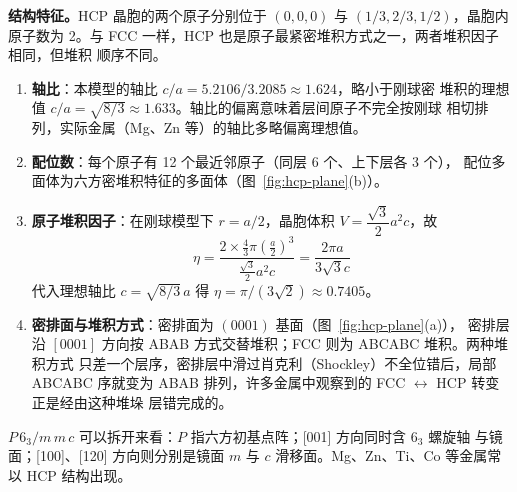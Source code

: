 \textbf{结构特征。}HCP 晶胞的两个原子分别位于 $(0,0,0)$ 与 $(1/3,2/3,1/2)$，晶胞内
原子数为 2。与 FCC 一样，HCP 也是原子最紧密堆积方式之一，两者堆积因子相同，但堆积
顺序不同。

\begin{enumerate}[label=（\arabic*）]
  \item \textbf{轴比}：本模型的轴比 $c/a=5.2106/3.2085\approx1.624$，略小于刚球密
    堆积的理想值 $c/a=\sqrt{8/3}\approx1.633$。轴比的偏离意味着层间原子不完全按刚球
    相切排列，实际金属（Mg、Zn 等）的轴比多略偏离理想值。
  \item \textbf{配位数}：每个原子有 12 个最近邻原子（同层 6 个、上下层各 3 个），
    配位多面体为六方密堆积特征的多面体（图~\ref{fig:hcp-plane}(b)）。
  \item \textbf{原子堆积因子}：在刚球模型下 $r=a/2$，晶胞体积
    $V=\dfrac{\sqrt{3}}{2}a^2c$，故
    \begin{equation}
      \eta=\frac{2\times\frac{4}{3}\pi\left(\frac{a}{2}\right)^3}
                {\frac{\sqrt{3}}{2}a^2c}
        =\frac{2\pi a}{3\sqrt{3}c}
    \end{equation}
    代入理想轴比 $c=\sqrt{8/3}\,a$ 得 $\eta=\pi/(3\sqrt{2})\approx0.7405$。
  \item \textbf{密排面与堆积方式}：密排面为 $(0001)$ 基面（图~\ref{fig:hcp-plane}(a)），
    密排层沿 $[0001]$ 方向按 ABAB 方式交替堆积；FCC 则为 ABCABC 堆积。两种堆积方式
    只差一个层序，密排层中滑过肖克利（Shockley）不全位错后，局部 ABCABC 序就变为
    ABAB 排列，许多金属中观察到的 FCC $\leftrightarrow$ HCP 转变正是经由这种堆垛
    层错完成的。
\end{enumerate}

$P\,6_3/m\,m\,c$ 可以拆开来看：$P$ 指六方初基点阵；[001] 方向同时含 $6_3$ 螺旋轴
与镜面；[100]、[120] 方向则分别是镜面 $m$ 与 $c$ 滑移面。Mg、Zn、Ti、Co 等金属常以
HCP 结构出现。
